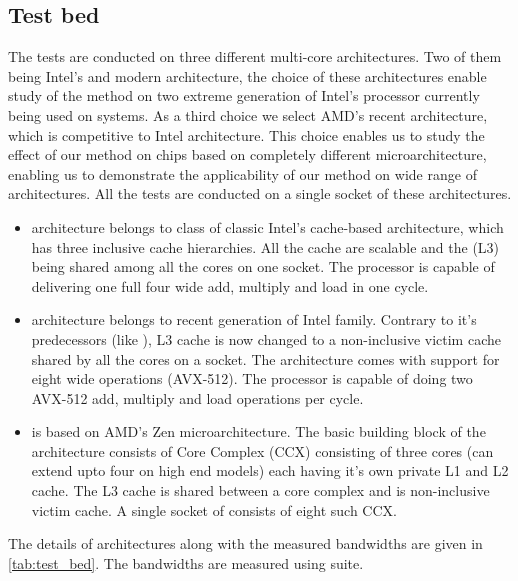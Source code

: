 \subsection{Test bed}
The tests are conducted on three different multi-core architectures. Two of them being Intel's \IVB and modern \SKX architecture, the choice of these architectures enable study of the method on two extreme generation of Intel's processor currently being used on \HPC systems. As a third choice we select AMD's recent \EPY architecture, which is competitive to Intel \SKX architecture. This choice enables us to study the effect of our method on chips based on completely different microarchitecture, enabling us to demonstrate the applicability of our method on wide range of architectures. All the tests are conducted on a single socket of these architectures. 

\begin{itemize}
	\item \Intel \IVB architecture belongs to class of classic Intel's cache-based architecture, which has three inclusive cache  hierarchies. All the cache are scalable and the \LLC (L3) being shared among all the cores on one socket. The processor is capable of delivering one full four wide \SIMD add, multiply and load in one cycle. 
	\item \Intel \SKX architecture belongs to recent generation of Intel family. Contrary to it's predecessors (like \IVB), L3 cache is now changed to a non-inclusive victim cache shared by all the cores on a socket. The architecture comes with support for eight wide \SIMD operations (AVX-512). The processor is capable of doing two AVX-512 add, multiply and load operations per cycle.
	\item \AMD \EPY is based on AMD's Zen microarchitecture. The basic building block of the architecture consists of Core Complex (CCX) consisting of three cores (can extend upto four on high end models) each having it's own private L1 and L2 cache. The L3 cache is shared between a core complex and is non-inclusive victim cache. A single socket of \EPY consists of eight such CCX.
	
\end{itemize}
The details of architectures along with the measured bandwidths are given in \cref{tab:test_bed}. The bandwidths are measured using \likwidBench suite.

